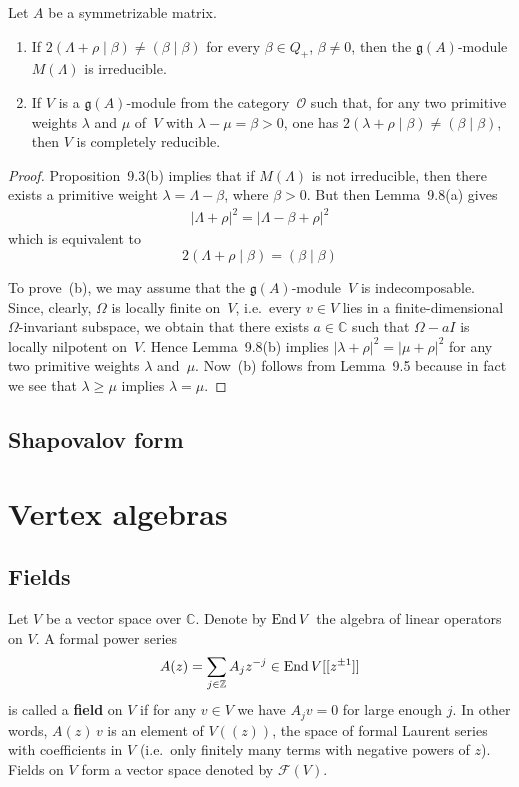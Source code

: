 \documentclass[12pt]{article}
\begin{document}
\begin{proposition}[9.9]
Let $A$ be a symmetrizable matrix.
\begin{enumerate}[label=\textup{(\alph*)}]
\item
If $2(\Lambda + \rho \mid \beta) \ne (\beta \mid \beta)$ for every $\beta \in Q_+$, $\beta \ne 0$,
then the $\mathfrak{g}(A)$-module $M(\Lambda)$ is irreducible.

\item
If $V$ is a $\mathfrak{g}(A)$-module from the category~$\mathcal{O}$ such that,
for any two primitive weights $\lambda$ and $\mu$ of~$V$ with $\lambda - \mu = \beta > 0$,
one has $2(\lambda + \rho \mid \beta) \ne (\beta \mid \beta)$,
then $V$ is completely reducible.
\end{enumerate}

\begin{proof}
Proposition~9.3(b) implies that if $M(\Lambda)$ is not irreducible,
then there exists a primitive weight $\lambda = \Lambda - \beta$, where $\beta > 0$.
But then Lemma~9.8(a) gives
\begin{align*}
|\Lambda + \rho|^2 = |\Lambda - \beta + \rho|^2
\end{align*}
which is equivalent to
\[2(\Lambda + \rho \mid \beta) = (\beta \mid \beta)\]


To prove~(b), we may assume that the $\mathfrak{g}(A)$-module~$V$ is indecomposable.
Since, clearly, $\Omega$ is locally finite on~$V$, i.e.\ every $v \in V$
lies in a finite-dimensional $\Omega$-invariant subspace, we obtain that there exists
$a \in \mathbb{C}$ such that $\Omega - aI$ is locally nilpotent on~$V$.
Hence Lemma~9.8(b) implies $|\lambda + \rho|^2 = |\mu + \rho|^2$
for any two primitive weights $\lambda$ and~$\mu$.
Now~(b) follows from Lemma~9.5 because in fact we see that $\lambda \ge \mu$ implies $\lambda = \mu$.
\end{proof}
\end{proposition}


\subsection{Shapovalov form}

\section{Vertex algebras}
\subsection{Fields}
Let $V$ be a vector space over $\mathbb{C}$. Denote by $\operatorname{End} V$ the algebra of linear operators on $V$.  
A formal power series
\begin{equation}\label{eq:field}
A(z) = \sum_{j \in \mathbb{Z}} A_j z^{-j} \in \operatorname{End} V[[z^{\pm1}]]
\end{equation}
is called a \textbf{field} on $V$ if for any $v \in V$ we have $A_j v = 0$ for large enough $j$.  
In other words, $A(z)\,v$ is an element of $V((z))$, the space of formal Laurent series with coefficients in $V$ (i.e.\ only finitely many terms with negative powers of $z$).  
Fields on $V$ form a vector space denoted by $\mathcal{F}(V)$.
\end{document}

